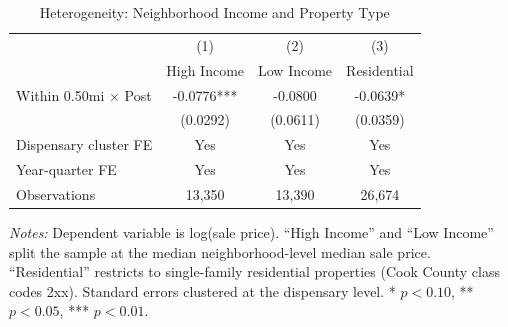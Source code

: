 \begin{table}[H]
\centering
\caption{Heterogeneity: Neighborhood Income and Property Type}
\label{tab:hetero}
\begin{threeparttable}
\begin{tabular}{lccc}
\toprule
 & (1) & (2) & (3) \\
 & High Income & Low Income & Residential \\
\midrule
Within 0.50mi $\times$ Post & -0.0776*** & -0.0800 & -0.0639* \\
 & (0.0292) & (0.0611) & (0.0359) \\[4pt]
\midrule
Dispensary cluster FE & Yes & Yes & Yes \\
Year-quarter FE & Yes & Yes & Yes \\
Observations & 13,350 & 13,390 & 26,674 \\
\bottomrule
\end{tabular}
\begin{tablenotes}[flushleft]
\small
\textit{Notes:} Dependent variable is log(sale price). ``High Income'' and ``Low Income'' split the sample at the median neighborhood-level median sale price. ``Residential'' restricts to single-family residential properties (Cook County class codes 2xx). Standard errors clustered at the dispensary level. * $p<0.10$, ** $p<0.05$, *** $p<0.01$.
\end{tablenotes}
\end{threeparttable}
\end{table}

